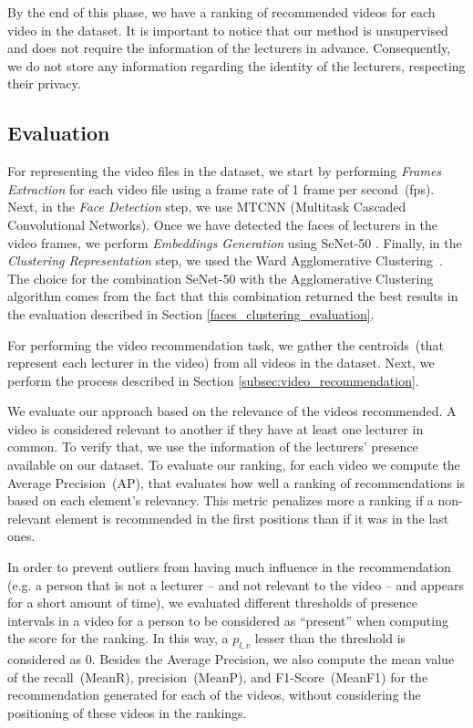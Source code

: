 By the end of this phase, we have a ranking of recommended videos for each video in the dataset.
It is important to notice that our method is unsupervised and does not require the information of the lecturers in advance.
Consequently, we do not store any information regarding the identity of the lecturers, respecting their privacy.

\subsection{Evaluation}

For representing the video files in the dataset, we start by performing \emph{Frames Extraction} for each video file using a frame rate of 1 frame per second~(fps). 
Next, in the \emph{Face Detection} step, we use MTCNN \cite{mtcnn} (Multitask
Cascaded Convolutional Networks). 
Once we have detected the faces of lecturers in the video frames, we perform \emph{Embeddings Generation} using SeNet-50 \cite{senet}.
Finally, in the \emph{Clustering Representation} step, we used the Ward Agglomerative Clustering~\cite{ward1963hierarchical}.
The choice for the combination SeNet-50 with the Agglomerative Clustering algorithm comes from the fact that this combination returned the best results in the evaluation described in Section \ref{faces_clustering_evaluation}.

For performing the video recommendation task, we gather the centroids~(that represent each lecturer in the video) from all videos in the dataset. Next, we perform the process described in Section \ref{subsec:video_recommendation}.

We evaluate our approach based on the relevance of the videos recommended. A video is considered relevant to another if they have at least one lecturer in common.
To verify that, we use the information of the lecturers' presence available on our dataset.
To evaluate our ranking, for each video we compute the Average Precision~(AP), that evaluates how well a ranking of recommendations is based on each element's relevancy. 
This metric penalizes more a ranking if a non-relevant element is recommended in the first positions than if it was in the last ones.

In order to prevent outliers from having much influence in the recommendation (e.g. a person that is not a lecturer -- and not relevant to the video -- and appears for a short amount of time), we evaluated different thresholds of presence intervals in a video for a person to be considered as ``present'' when computing the score for the ranking. 
In this way, a $p_{l,v}$ lesser than the threshold is considered as $0$.
Besides the Average Precision, we also compute the mean value of the recall~(MeanR), precision~(MeanP), and F1-Score~(MeanF1) for the recommendation generated for each of the videos, without considering the positioning of these videos in the rankings.

